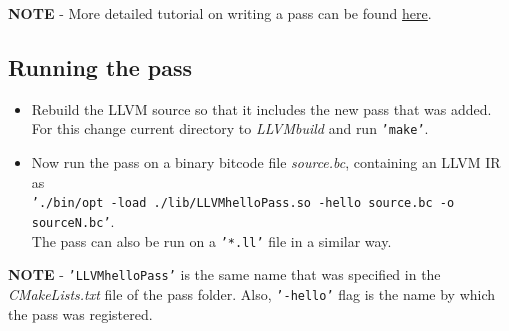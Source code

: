 \textbf{NOTE} - More detailed tutorial on writing a pass can be found 
\href{http://llvm.org/docs/WritingAnLLVMPass.html#quick-start-writing-hello-world}{here}.

\subsection{Running the pass}
\label{subsec:RunningThePass}
\begin{itemize} \tightlist
    \item Rebuild the LLVM source so that it includes the new
    pass that was added. For this change current directory to \textit
    {LLVMbuild} and run \texttt{'make'}.
    \item Now run the pass on a binary bitcode file \textit{source.bc}, 
    containing an LLVM IR as \\
    \texttt{'./bin/opt -load ./lib/LLVMhelloPass.so -hello source.bc -o sourceN.bc'}.\\
    The pass can also be run on a \texttt{'*.ll'} file in a similar way.
    
  \end{itemize}
  
\noindent \textbf{NOTE} - \texttt{'LLVMhelloPass'} is the same name that was
specified in the \textit{CMakeLists.txt} file of the pass folder. Also, 
\texttt{'-hello'} flag is the name by which the pass was registered.
